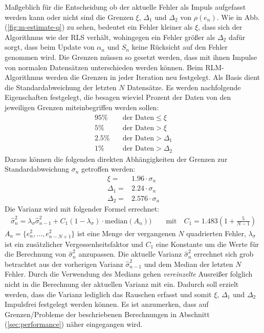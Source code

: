 \documentclass[a4paper, 12pt]{article}
\begin{document}
{Maßgeblich für die Entscheidung ob der aktuelle Fehler als Impuls aufgefasst werden kann oder nicht sind die Grenzen $\xi$, $\Delta_1$ und $\Delta_2$ von $\rho(e_n)$. Wie in Abb. (\ref{fig:m-estimate-q}) zu sehen, bedeutet ein Fehler kleiner als $\xi$, dass sich der Algorithmus wie der RLS verhält, wohingegen ein Fehler größer als $\Delta_2$ dafür sorgt, dass beim Update von $\alpha_n$ und $S_n$ keine Rücksicht auf den Fehler genommen wird.
Die Grenzen müssen so gesetzt werden, dass mit ihnen Impulse von normalen Datensätzen unterschieden werden können.
Beim RLM-Algorithmus werden die Grenzen in jeder Iteration neu festgelegt. Als Basis dient die Standardabweichung der letzten $N$ Datensätze. Es werden nachfolgende Eigenschaften festgelegt, die besagen wieviel Prozent der Daten von den jeweiligen Grenzen miteinbegriffen werden sollen:
\begin{align}
    95\%& \quad \text{der Daten} \leq \xi \nonumber\\
    5\%& \quad \text{der Daten} > \xi \nonumber\\
    2.5\%& \quad \text{der Daten} > \Delta_1 \nonumber\\
    1\%& \quad \text{der Daten} > \Delta_2 \nonumber
\end{align}
Daraus können die folgenden direkten Abhängigkeiten der Grenzen zur Standardabweichung $\sigma_n$ getroffen werden:
\begin{align}
    \label{eq:rlm:rlm:limits}
    \xi =& 1.96 \cdot \sigma_n \nonumber\\
    \Delta_1 =& 2.24 \cdot \sigma_n \\
    \Delta_2 =& 2.576 \cdot \sigma_n \nonumber
\end{align}
Die Varianz wird mit folgender Formel errechnet:
\begin{align*}
    \hat{\sigma}^2_n = \lambda_\sigma\hat{\sigma}^2_{n-1} + C_1(1-\lambda_\sigma)\cdot \text{median}(A_n)) \quad\quad \text{mit}  \quad C_1 = 1.483(1+\frac{5}{N-1})
\end{align*}
$A_n = \{e^2_n, \ldots, e^2_{n-N+1}\}$ ist eine Menge der vergangenen $N$ quadrierten Fehler, $\lambda_\sigma$ ist ein zusätzlicher Vergessenheitsfaktor und $C_1$ eine Konstante um die Werte für die Berechnung von $\hat{\sigma}^2_n$ anzupassen.
Die aktuelle Varianz $\hat{\sigma}^2_n$ errechnet sich grob betrachtet aus der vorherigen Varianz $\hat{\sigma}^2_{n-1}$ und dem Median der letzten $N$ Fehler. Durch die Verwendung des Medians gehen \emph{vereinzelte} Ausreißer folglich nicht in die Berechnung der aktuellen Varianz mit ein. 
Dadurch soll erzielt werden, dass die Varianz lediglich das Rauschen erfasst und somit $\xi$, $\Delta_1$ und $\Delta_2$ Impulsfrei festgelegt werden können. Es ist anzumerken, dass auf Grenzen/Probleme der beschriebenen Berechnungen in Abschnitt (\ref{sec:performance}) näher eingegangen wird.

}
\end{document}
